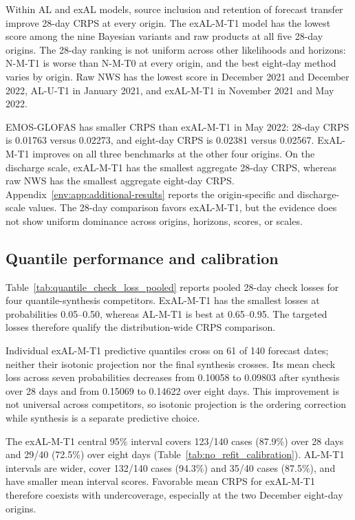 Within AL and exAL models, source inclusion and retention of forecast transfer
improve 28-day CRPS at every origin. The exAL-M-T1 model has the lowest score
among the nine Bayesian variants and raw products at all five 28-day origins.
The 28-day ranking is not uniform across other likelihoods and horizons:
N-M-T1 is worse than N-M-T0 at every origin, and the best eight-day method
varies by origin. Raw NWS has the lowest score in December 2021 and December
2022, AL-U-T1 in January 2021, and exAL-M-T1 in November 2021 and May 2022.

EMOS-GLOFAS has smaller CRPS than exAL-M-T1 in May 2022: 28-day CRPS is
0.01763 versus 0.02273, and eight-day CRPS is 0.02381 versus 0.02567. ExAL-M-T1 improves on
all three benchmarks at the other four origins. On the discharge scale,
exAL-M-T1 has the smallest aggregate 28-day CRPS, whereas raw NWS has the
smallest aggregate eight-day CRPS. Appendix~\ref{env:app:additional-results}
reports the origin-specific and discharge-scale values. The 28-day comparison
favors exAL-M-T1, but the evidence does not show uniform dominance across
origins, horizons, scores, or scales.

\subsection{Quantile performance and calibration}

Table~\ref{tab:quantile_check_loss_pooled} reports pooled 28-day check losses
for four quantile-synthesis competitors. ExAL-M-T1 has the smallest losses at
probabilities 0.05--0.50, whereas AL-M-T1 is best at 0.65--0.95. The targeted
losses therefore qualify the distribution-wide CRPS comparison.



Individual exAL-M-T1 predictive quantiles cross on 61 of 140 forecast dates;
neither their isotonic projection nor the final synthesis crosses. Its mean
check loss across seven probabilities decreases from 0.10058 to 0.09803 after
synthesis over 28 days and from 0.15069 to 0.14622 over eight days. This
improvement is not universal across competitors, so isotonic projection is
the ordering correction while synthesis is a separate predictive choice.

The exAL-M-T1 central 95\% interval covers 123/140 cases (87.9\%) over 28
days and 29/40 (72.5\%) over eight days (Table~\ref{tab:no_refit_calibration}).
AL-M-T1 intervals are wider, cover 132/140 cases (94.3\%) and 35/40 cases
(87.5\%), and have smaller mean interval scores. Favorable mean CRPS for
exAL-M-T1 therefore coexists with undercoverage, especially at the two
December eight-day origins.

